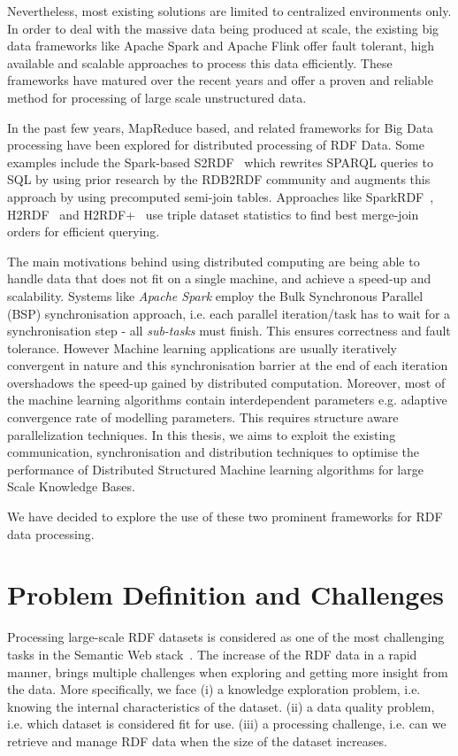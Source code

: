 Nevertheless, most existing solutions are limited to centralized environments only.
In order to deal with the massive data being produced at scale, the existing big data frameworks like Apache Spark and Apache Flink offer fault tolerant, high available and scalable approaches to process this data efficiently. 
These frameworks have matured over the recent years and offer a proven and reliable method for processing of large scale unstructured data.

In the past few years, MapReduce based, and related frameworks for Big Data processing have been explored for distributed processing of \gls{RDF} Data. 
Some examples include the Spark-based S2RDF~\cite{Schatzle:2016:SRQ:2977797.2977806} which rewrites SPARQL queries to SQL by using prior research by the RDB2RDF community and augments this approach by using precomputed semi-join tables. Approaches like SparkRDF~\cite{xu2015sparkrdf}, H2RDF~\cite{papailiou2013h} and H2RDF+~\cite{papailiou2012h2rdf} use triple dataset statistics to find best merge-join orders for efficient querying.

The main motivations behind using distributed computing are being able to handle data that does not fit on a single machine, and achieve a speed-up and scalability.
Systems like \textit{Apache Spark} employ the Bulk Synchronous Parallel (BSP) synchronisation approach, i.e. each parallel iteration/task has to wait for a synchronisation step - all \textit{sub-tasks} must finish. 
This ensures correctness and fault tolerance.
However Machine learning applications are usually iteratively convergent in nature and this synchronisation barrier at the end of each iteration overshadows the speed-up gained by distributed computation. 
Moreover, most of the machine learning algorithms contain interdependent parameters e.g. adaptive convergence rate of modelling parameters. 
This requires structure aware parallelization techniques. 
In this thesis, we aims to exploit the existing communication, synchronisation and distribution techniques to optimise the performance of Distributed Structured Machine learning algorithms for large Scale Knowledge Bases.

We have decided to explore the use of these two prominent frameworks for RDF data processing.

\section{Problem Definition and Challenges}
\label{sec:problem-definition-and-challenges}
Processing large-scale RDF datasets is considered as one of the most challenging tasks in the Semantic Web stack~\cite{Benjamins02sixchallenges}.
The increase of the RDF data in a rapid manner, brings multiple challenges when exploring and getting more insight from the data.
More specifically, we face (i) a knowledge exploration problem, i.e. knowing the internal characteristics of the dataset. 
(ii) a data quality problem, i.e. which dataset is considered fit for use.
(iii) a processing challenge, i.e. can we retrieve and manage RDF data when the size of the dataset increases.


